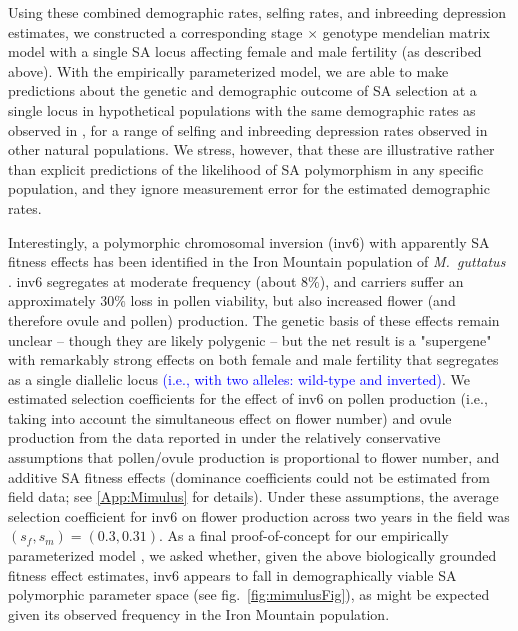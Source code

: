 \documentclass[11pt]{article}
\begin{document}
Using these combined demographic rates, selfing rates, and inbreeding depression estimates, we constructed a corresponding stage $\times$ genotype mendelian matrix model with a single SA locus affecting female and male fertility (as described above). With the empirically parameterized model, we are able to make predictions about the genetic and demographic outcome of SA selection at a single locus in hypothetical populations with the same demographic rates as observed in \citet{PetersonEtAl2016}, for a range of selfing and inbreeding depression rates observed in other natural populations. We stress, however, that these are illustrative rather than explicit predictions of the likelihood of SA polymorphism in any specific population, and they ignore measurement error for the estimated demographic rates.

Interestingly, a polymorphic chromosomal inversion (inv6) with apparently SA fitness effects has been identified in the Iron Mountain population of {\itshape M.~guttatus} \citep{LeeKelly2015}. inv6 segregates at moderate frequency (about $8\%$), and carriers suffer an approximately $30 \%$ loss in pollen viability, but also increased flower (and therefore ovule and pollen) production. The genetic basis of these effects remain unclear -- though they are likely polygenic -- but the net result is a "supergene" with remarkably strong effects on both female and male fertility that segregates as a single diallelic locus \textcolor{blue}{(i.e., with two alleles: wild-type and inverted)}. We estimated selection coefficients for the effect of inv6 on pollen production (i.e., taking into account the simultaneous effect on flower number) and ovule production from the data reported in \citet{LeeKelly2015} under the relatively conservative assumptions that pollen/ovule production is proportional to flower number, and  additive SA fitness effects (dominance coefficients could not be estimated from field data; see \ref{App:Mimulus} for details). Under these assumptions, the average selection coefficient for inv6 on flower production across two years in the field was $(s_f,s_m) = (0.3,0.31)$. As a final proof-of-concept for our empirically parameterized model \citep[e.g.,][]{Servedio2014}, we asked whether, given the above biologically grounded fitness effect estimates, inv6 appears to fall in demographically viable SA polymorphic parameter space (see fig.~\ref{fig:mimulusFig}), as might be expected given its observed frequency in the Iron Mountain population.
\end{document}
